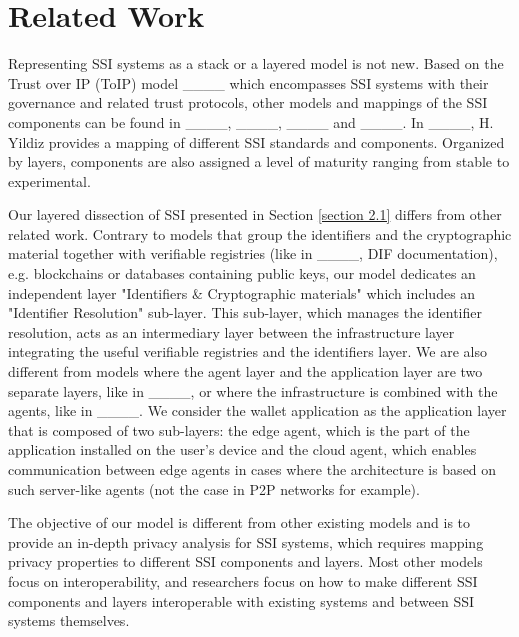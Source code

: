\section{Related Work}
\label{RelatedWork}
Representing SSI systems as a stack or a layered model is not new. Based on the Trust over IP (ToIP) model ____ which encompasses SSI systems with their governance and related trust protocols, other models and mappings of the SSI components can be found in ____, ____, ____ and ____. In ____, H. Yildiz provides a mapping of different SSI standards and components. Organized by layers, components are also assigned a level of maturity ranging from stable to experimental.

Our layered dissection of SSI presented in Section \ref{section 2.1} differs from other related work. Contrary to models that group the identifiers and the cryptographic material together with verifiable registries (like in ____, DIF documentation), e.g. blockchains or databases containing public keys, our model dedicates an independent layer "Identifiers \& Cryptographic materials" which includes an "Identifier Resolution" sub-layer. This sub-layer, which manages the identifier resolution, acts as an intermediary layer between the infrastructure layer integrating the useful verifiable registries and the identifiers layer. We are also different from models where the agent layer and the application layer are two separate layers, like in ____, or where the infrastructure is combined with the agents, like in ____. We consider the wallet application as the application layer that is composed of two sub-layers: the edge agent, which is the part of the application installed on the user's device and the cloud agent, which enables communication between edge agents in cases where the architecture is based on such server-like agents (not the case in P2P networks for example).


The objective of our model is different from other existing models and is to provide an in-depth privacy analysis for SSI systems, which requires mapping privacy properties to different SSI components and layers. Most other models focus on interoperability, and researchers focus on how to make different SSI components and layers interoperable with existing systems and between SSI systems themselves. 

